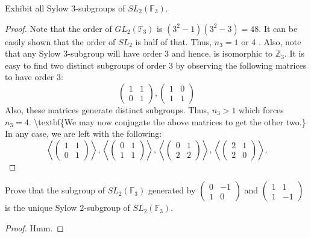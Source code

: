 \begin{exercise}
Exhibit all Sylow 3-subgroups of $S L_2\left(\mathbb{F}_3\right)$.
\end{exercise}
\begin{proof}
Note that the order of $G L_2\left(\mathbb{F}_3\right)$ is $\left(3^2-1\right)\left(3^2-3\right)=48$. It can be easily shown that the order of $S L_2$ is half of that.
Thus, $n_3=1$ or 4 . Also, note that any Sylow 3-subgroup will have order 3 and hence, is isomorphic to $\mathbb{Z}_3$.
It is easy to find two distinct subgroups of order 3 by observing the following matrices to have order 3:
\[
\left(\begin{array}{ll}
1 & 1 \\
0 & 1
\end{array}\right),\left(\begin{array}{ll}
1 & 0 \\
1 & 1
\end{array}\right)
\]
Also, these matrices generate distinct subgroups. Thus, $n_3>1$ which forces $n_3=4$. \textbackslash{}textbf\{We may now conjugate the above matrices to get the other two.\} In any case, we are left with the following:
\[
\left\langle\left(\begin{array}{ll}
1 & 1 \\
0 & 1
\end{array}\right)\right\rangle,\left\langle\left(\begin{array}{ll}
0 & 1 \\
1 & 1
\end{array}\right)\right\rangle,\left\langle\left(\begin{array}{ll}
0 & 1 \\
2 & 2
\end{array}\right)\right\rangle,\left\langle\left(\begin{array}{ll}
2 & 1 \\
2 & 0
\end{array}\right)\right\rangle .
\]
\end{proof}

\begin{exercise}
Prove that the subgroup of $S L_2\left(\mathbb{F}_3\right)$ generated by $\left(\begin{array}{cc}0 & -1 \\ 1 & 0\end{array}\right)$ and $\left(\begin{array}{cc}1 & 1 \\ 1 & -1\end{array}\right)$ is the unique Sylow 2-subgroup of $S L_2\left(\mathbb{F}_3\right)$.
\end{exercise}
\begin{proof}
Hmm.
\end{proof}

